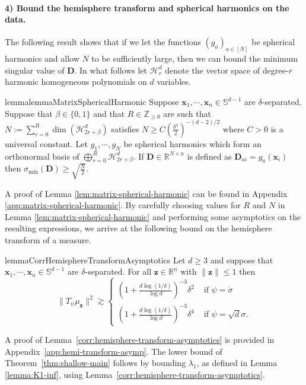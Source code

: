 \documentclass{article}
\theoremstyle{definition}
\newcommand*{\R}{\mathbb{R}}
\newcommand{\mc}{\mathcal}
\renewcommand{\S}{\mathbb{S}}
\def\vx{{\bm{x}}}
\def\vz{{\bm{z}}}
\def\mD{{\bm{D}}}
\begin{document}
\paragraph{4) Bound the hemisphere transform and spherical harmonics on the data.} 
The following result shows that if we let the functions $(g_a)_{a \in [N]}$ be spherical harmonics and allow $N$ to be sufficiently large, then we can bound the minimum singular value of $\mD$.
In what follows let $\mc{H}_r^d$ denote the vector space of degree-$r$ harmonic homogeneous polynomials on $d$ variables. 

\begin{restatable}{lemma}{lemmaMatrixSphericalHarmonic}
\label{lem:matrix-spherical-harmonic}
Suppose $\vx_1, \cdots, \vx_n \in \S^{d - 1}$ are $\delta$-separated. Suppose that $\beta \in \{0, 1\}$ and that $R \in \mathbb{Z}_{\geq 0}$ are such that
$N := \sum_{r = 0}^R \dim(\mc{H}_{2r + \beta}^d)$
satisfies $N \geq  C\left(\frac{\delta^4}{2}\right)^{-(d - 2)/2}$ where $C >0$ is a universal constant. Let $g_1, \cdots, g_N$ be spherical harmonics which form an orthonormal basis of
$
\bigoplus_{r = 0}^R \mc{H}_{2r + \beta}^d.$
If $\mD \in \R^{N \times n}$ is defined as $\mD_{ai} = g_a(\vx_i)$ then
$\sigma_{\min}(\mD) \geq \sqrt{\frac{N}{2}}. $
\end{restatable}
A proof of Lemma \ref{lem:matrix-spherical-harmonic} can be found in Appendix \ref{app:matrix-spherical-harmonic}. 
By carefully choosing values for $R$ and $N$ in Lemma \ref{lem:matrix-spherical-harmonic} and performing some asymptotics on the resulting expressions, we arrive at the following bound on the hemisphere transform of a measure.
\begin{restatable}{lemma}{CorrHemisphereTransformAsymptotics}\label{corr:hemisphere-transform-asymptotics}
Let $d \geq 3$ and suppose that $\vx_1, \cdots, \vx_n \in \S^{d - 1}$ are $\delta$-separated. For all $\vz \in \R^n$ with $\|\vz\| \leq 1$ then
        \[\|T_{\psi} \mu_{\vz}\|^2 \gtrsim \begin{cases}
            \left(1 + \frac{d\log(1/\delta)}{\log d}\right)^{-3} \delta^2 & \text{ if $\psi = \dot{\sigma}$}\\
            \left(1+ \frac{d\log(1/\delta) }{\log d}\right)^{-3}\delta^4 & \text{ if $\psi = \sqrt{d}\sigma$}.
        \end{cases} \]      
\end{restatable}

A proof of Lemma~\ref{corr:hemisphere-transform-asymptotics} 
is provided in Appendix~\ref{app:hemi-transform-asymp}. 
The lower bound of Theorem~\ref{thm:shallow-main} follows by bounding $\lambda_1$, as defined in Lemma \ref{lemma:K1-inf}, using Lemma~\ref{corr:hemisphere-transform-asymptotics}. 
\end{document}
